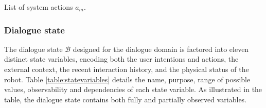\begin{table}[p!]
\begin{footnotesize}
\end{footnotesize}
 \caption{List of system actions $a_m$.} 
\label{table:systemdas_exp3}
\end{table}

\subsubsection*{Dialogue state}

The dialogue state $\mathcal{B}$ designed for the dialogue domain is factored into eleven distinct state variables, encoding both the user intentions and actions, the external context, the recent interaction history, and the physical status of the robot. Table \ref{table:statevariables} details the name, purpose, range of possible values, observability and dependencies of each state variable. As illustrated in the table, the dialogue state contains both fully and partially observed variables. 



